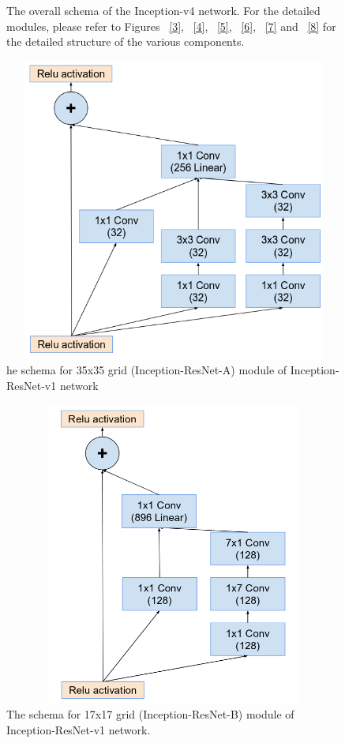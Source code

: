 \documentclass[a4paper,12pt, twoside]{NITKReport}
\begin{document}
\begin{figure}
\begin{minipage}[b]{0.4\textwidth}
    \caption{The overall schema of the Inception-v4 network. For the
detailed modules, please refer to Figures ~\ref{3}, ~\ref{4}, ~\ref{5}, ~\ref{6}, ~\ref{7} and ~\ref{8} for the detailed structure of the various components.}
    \label{9}
  \end{minipage}
\end{figure}


\begin{figure}[h]
  \centering
    \includegraphics[height=10cm,width=13cm]{figure10.png}
\caption{he  schema  for 35x35 grid  (Inception-ResNet-A) module of Inception-ResNet-v1 network}
\label{10}
\end{figure}

\begin{figure}[h]
  \centering
    \includegraphics[height=10cm,width=13cm]{figure11.png}
    \caption{The  schema  for 17x17 grid  (Inception-ResNet-B) module of Inception-ResNet-v1 network.}
    \label{11}
 
\end{figure}
\end{document}

